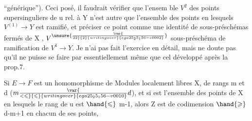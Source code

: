 
 ``générique'').   Ceci posé, il faudrait vérifier que l'ensem ble $V^2$
des points supersinguliers de u rel. à Y n'est autre que l'ensemble des
points en lesquels $V^{(1)} \longrightarrow Y$ est ramifié, et préciser ce point
comme une identité de sous-préschémas fermés de X , $V^{\unsure{\var{\over{2}{2}}{2}{writing over}{ega25_25_156-v0002}}}$  sous-préschéma
de ramification de $V^1 \longrightarrow Y$. Je n'ai pas fait l'exercice en détail,
mais ne doute pas qu'il ne puisse se faire par essentiellement  même
  que cel développé après la prop.7.

 Si $E \longrightarrow F$ est un homomorphisme de Modules localement libres  
X, de rangs m et d ($m \var{\over{<}{\leqslant}}{\leqslant}{writing over}{ega25_25_156-v0010} d$), et si  est l'ensemble des points de X en
lesquels le rang de u est $\hand{\leqslant}$ m-1, alors  Z est de codimension $\hand{\geqslant}$ d-m+1
en chacun de ses points, 

